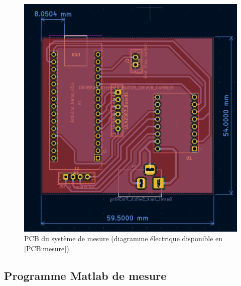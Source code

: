 \begin{figure}[H]
    \centering
    \includegraphics[width = \textwidth]{assets/figures/ameliorations/PCB_rotation_translation.png}
    \caption[PCB du système de mesure]{PCB du système de mesure (diagramme électrique disponible en \autoref{PCB:mesure})}
\end{figure}

\newpage
\subsection{Programme Matlab de mesure}
